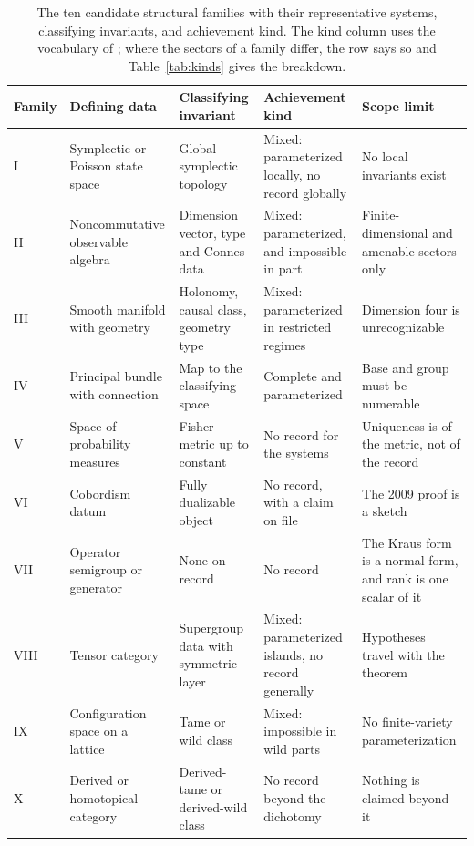 \documentclass[11pt,letterpaper]{article}
\theoremstyle{definition}
\theoremstyle{remark}
\begin{document}
\begin{table}[ht]
\centering
\small
\caption{The ten candidate structural families with their representative systems, classifying invariants, and achievement kind. The kind column uses the vocabulary of ; where the sectors of a family differ, the row says so and Table~\ref{tab:kinds} gives the breakdown.}
\label{tab:families}
\begin{tabularx}{\textwidth}{L{0.07\textwidth} L{0.16\textwidth} L{0.20\textwidth} L{0.15\textwidth} X}
\toprule
Family & Defining data & Classifying invariant & Achievement kind & Scope limit \\
\midrule
I & Symplectic or Poisson state space & Global symplectic topology & Mixed: parameterized locally, no record globally & No local invariants exist \\
II & Noncommutative observable algebra & Dimension vector, type and Connes data & Mixed: parameterized, and impossible in part & Finite-dimensional and amenable sectors only \\
III & Smooth manifold with geometry & Holonomy, causal class, geometry type & Mixed: parameterized in restricted regimes & Dimension four is unrecognizable \\
IV & Principal bundle with connection & Map to the classifying space & Complete and parameterized & Base and group must be numerable \\
V & Space of probability measures & Fisher metric up to constant & No record for the systems & Uniqueness is of the metric, not of the record \\
VI & Cobordism datum & Fully dualizable object & No record, with a claim on file & The 2009 proof is a sketch \\
VII & Operator semigroup or generator & None on record & No record & The Kraus form is a normal form, and rank is one scalar of it \\
VIII & Tensor category & Supergroup data with symmetric layer & Mixed: parameterized islands, no record generally & Hypotheses travel with the theorem \\
IX & Configuration space on a lattice & Tame or wild class & Mixed: impossible in wild parts & No finite-variety parameterization \\
X & Derived or homotopical category & Derived-tame or derived-wild class & No record beyond the dichotomy & Nothing is claimed beyond it \\
\bottomrule
\end{tabularx}
\end{table}
\end{document}
